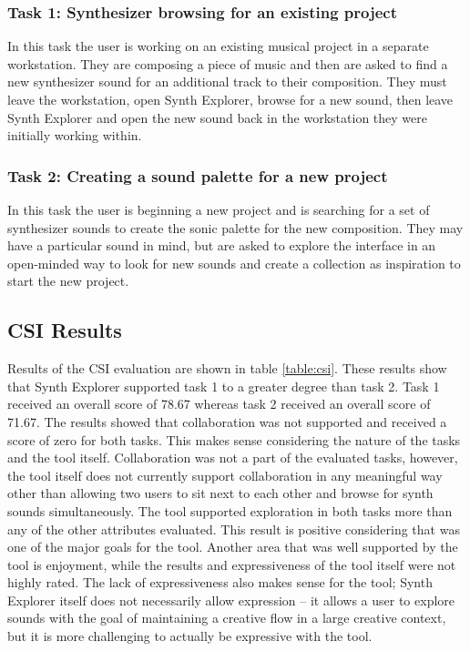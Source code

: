 \subsubsection{Task 1: Synthesizer browsing for an existing project}
In this task the user is working on an existing musical project in a separate workstation. They are composing a piece of music and then are asked to find a new synthesizer sound for an additional track to their composition. They must leave the workstation,
open Synth Explorer, browse for a new sound, then leave Synth Explorer and open the new sound back in the workstation they were initially working within.

\subsubsection{Task 2: Creating a sound palette for a new project}
In this task the user is beginning a new project and is searching for a set of synthesizer sounds to create the sonic palette for the new composition. They may have a particular sound in mind, but are asked to explore the interface in an open-minded way to look for new sounds and create a collection as inspiration to start the new project.

\subsection{CSI Results}
Results of the CSI evaluation are shown in table \ref{table:csi}. These results show that Synth Explorer supported task 1 to a greater degree than task 2. Task 1 received an overall score of 78.67 whereas task 2 received an overall score of 71.67. The results showed that collaboration was not supported and received a score of zero for both tasks. This makes sense considering the nature of the tasks and the tool itself. Collaboration was not a part of the evaluated tasks, however, the tool itself does not currently support collaboration in any meaningful way other than allowing two users to sit next to each other and browse for synth sounds simultaneously. The tool supported exploration in both tasks more than any of the other attributes evaluated. This result is positive considering that was one of the major goals for the tool. Another area that was well supported by the tool is enjoyment, while the results and expressiveness of the tool itself were not highly rated. The lack of expressiveness also makes sense for the tool; Synth Explorer itself does not necessarily allow expression -- it allows a user to explore sounds with the goal of maintaining a creative flow in a large creative context, but it is more challenging to actually be expressive with the tool.

